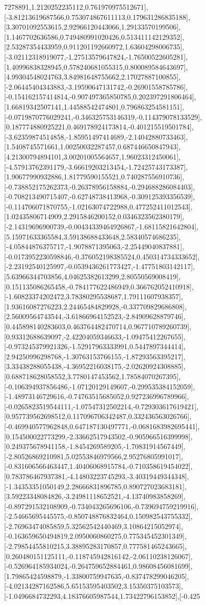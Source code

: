 \documentclass{article}
\begin{document}
7278891,1.2120252235112,0.761970975512671],[-3.81213619687566,0.753074867611113,0.179631286835188],[3.30701092553615,2.92966120443066,1.29133570199506],[1.1467702636586,0.749480991020426,0.513411142129352],[2.53287354433959,0.911201192660972,1.63604298006735],[-3.02112318919077,-1.27513579647824,-1.76500522605281],[1.40996838328945,0.578240681055315,0.800089584643697],[4.99304548024763,3.84981648755662,2.17027887100855],[-2.06445404343883,-3.19590647131742,-0.26901558785786],[-0.154162157414814,-0.907497365850785,0.202397291806464],[1.66819342507141,1.44588542474801,0.796863254581151],[-0.0719870776029241,-0.346325753146319,-0.114379078133529],[0.187774880925221,0.469178924173814,-0.401215519501784],[-3.62359874514858,-1.85951497414689,-2.14042880733463],[1.5408745571661,1.00250032287457,0.687446650847943],[4.21300794894101,3.00201005564657,1.96023312450061],[-4.57913762391179,-3.66619203213454,-1.72425743173387],[1.90677990932886,1.81779590155521,0.740287556910736],[-0.738852175262373,-0.26378956158884,-0.294688286084403],[-0.708213490715407,-0.62748738413968,-0.309125393356539],[-0.114706071870755,-1.02163074722988,0.477252411012543],[1.02435806714909,2.2915846200152,0.0346323562380179],[-2.14319696900739,-0.00434339464926867,-1.68115821642804],[5.15971633365584,3.59138688433648,2.58340574686235],[-4.05844876375717,-1.9078871395063,-2.25449040837881],[-0.0173952230598846,-0.376052198385524,0.450314734333652],[-2.23192540125997,-0.0539436261773427,-1.47751803142117],[5.63966344703856,4.04625382613299,2.80550569008419],[0.151135086265458,-0.784177622486949,0.366762052410918],[-1.60823374202472,3.78380295538687,1.79111607938357],[1.93616087276223,2.24465484829928,-0.337709829686808],[2.56009564743544,-3.61866964152523,-2.84909628879746],[0.445898140283603,0.463764482470714,0.967710789260739],[0.93312688639097,-2.42204059346633,-1.09475412267655],[-0.973245379921326,-1.52917963333991,0.5447897344414],[2.94250996298768,-1.30763153766155,-1.87293563395217],[3.33438288055438,-4.36952216038175,-2.02620924308885],[0.688718628058552,3.7780147453562,1.78584070267395],[-0.106394937856486,-1.07120129149607,-0.299535384152059],[-1.48973146729616,-0.74763515685052,0.927236996789966],[-0.0265823519544111,-1.07547312502214,-0.729303617619421],[0.957739562698512,0.117096706342487,0.332436563026766],[-0.469940577962848,0.647187130497771,-0.0681683982695441],[0.154500022773299,-2.33662517943502,-0.905966516399998],[0.249375678941158,-1.8454269589205,-1.70831914567449],[-2.80526869210981,5.02553846979566,2.95276805991017],[-0.831606566463447,1.40406068915784,-0.710358619454022],[0.783786467937381,-4.14803223745293,-3.40319449344348],[-1.34353351050149,2.28666831896785,0.890727023683181],[3.59223348084826,-3.24981118652521,-4.13740983858269],[-0.897291532108909,-0.734043265696106,-0.739694759219916],[-2.54665695445575,-0.850748876832464,0.150982543755332],[-2.76963474085859,5.32562542440469,3.10864215052974],[-0.163659650494819,2.0950060860275,0.775345452301349],[-2.79854455810215,3.38895283170857,0.777581465243665],[0.260480151125111,-0.118745942816142,-2.06110238126067],[-0.526964185934024,-0.264759652884461,0.98608456081699],[1.79865424598879,-1.33800759947635,-0.837478299046205],[-4.02134287162586,5.65153595403502,3.15350375103573],[-1.0496684732293,4.18376605987544,1.73422796153852],[-0.425
\end{document}
